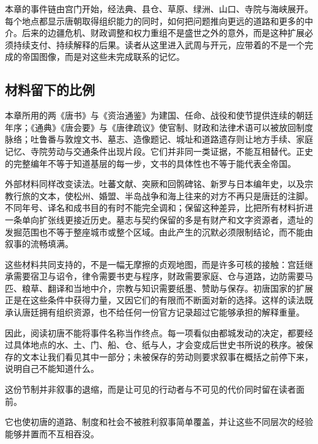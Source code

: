 本章的事件链由宫门开始，经法典、县仓、草原、绿洲、山口、寺院与海峡展开。每个地点都显示唐朝取得组织能力的同时，如何把问题推向更远的道路和更多的中介。后来的边疆危机、财政调整和权力重组不是盛世之外的意外，而是这种扩展必须持续支付、持续解释的后果。读者从这里进入武周与开元，应带着的不是一个完成的帝国图像，而是对这些未完成联系的记忆。

\subsection{材料留下的比例}
本章所用的两《唐书》与《资治通鉴》为建国、任命、战役和使节提供连续的朝廷年序；《通典》《唐会要》与《唐律疏议》使官制、财政和法律术语可以被放回制度脉络；吐鲁番与敦煌文书、墓志、造像题记、城址和道路遗存则让地方手续、家庭记忆、寺院劳动与交通条件出现片段。它们并非同一类证据，不能互相替代。正史的完整编年不等于知道基层的每一步，文书的具体性也不等于能代表全帝国。

外部材料同样改变读法。吐蕃文献、突厥和回鹘碑铭、新罗与日本编年史，以及宗教行旅的文本，使松州、婚盟、半岛战争和海上往来的对方不再只是唐廷的注脚。不同年号、译名和成书目的有时不能完全调和；保留这种差异，比把所有材料折进一条单向扩张线更接近历史。墓志与契约保留的多是有财产和文字资源者，遗址的发掘范围也不等于整座城市或整个区域。由此产生的沉默必须限制结论，而不能由叙事的流畅填满。

这些材料共同支持的，不是一幅无摩擦的贞观地图，而是许多可核的接触：宫廷继承需要宿卫与诏令，律令需要书吏与程序，财政需要家庭、仓与道路，边防需要马匹、粮草、翻译和当地中介，宗教与知识需要纸墨、赞助与保存。初唐国家的扩展正是在这些条件中获得力量，又因它们的有限而不断面对新的选择。这样的读法既承认唐廷拥有组织资源，也不给任何一份官方记录超过它能够承担的解释重量。

因此，阅读初唐不能将事件名称当作终点。每一项看似由都城发动的决定，都要经过具体地点的水、土、门、船、仓、纸与人，才会变成后世史书所说的秩序。被保存的文本让我们看见其中一部分；未被保存的劳动则要求叙事在概括之前停下来，说明自己不能知道什么。

这份节制并非叙事的退缩，而是让可见的行动者与不可见的代价同时留在读者面前。

它也使初唐的道路、制度和社会不被胜利叙事简单覆盖，并让这些不同层次的经验能够并置而不互相吞没。

